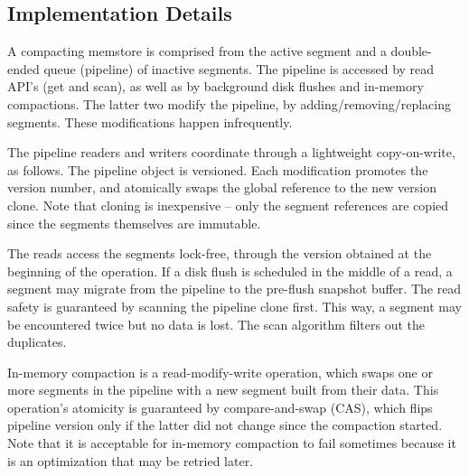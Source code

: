 \subsection{Implementation Details} \label{ssec:impl-details}

A compacting memstore is comprised from the active segment and a double-ended queue (pipeline) of inactive segments. 
The pipeline is accessed by read API's (get and scan), as well as by background disk flushes and in-memory compactions. 
The latter two modify the pipeline, by adding/removing/replacing segments. These modifications happen infrequently. 

The pipeline readers and writers coordinate through a lightweight copy-on-write, as follows. The pipeline object is versioned. 
Each modification promotes the version number, and atomically swaps the global reference to the new version clone. Note
that cloning is inexpensive -- only the segment references are copied since the segments themselves are immutable. 

The reads access the segments lock-free, through the version obtained at the beginning of the operation. If a disk flush
is scheduled in the middle of a read, a segment may migrate from the pipeline to the pre-flush snapshot buffer. The read 
safety is guaranteed by scanning the pipeline clone first. This way, a segment may be encountered twice but no data is 
lost. The scan algorithm filters out the duplicates. 

In-memory compaction is a read-modify-write operation, which swaps one or more segments in the pipeline 
with a new segment built from their data. This operation's atomicity is guaranteed by compare-and-swap (CAS), 
which flips pipeline version only if the latter did not change since the compaction started. Note that it is acceptable
for in-memory compaction to fail sometimes because it is an optimization that may be retried later. 

